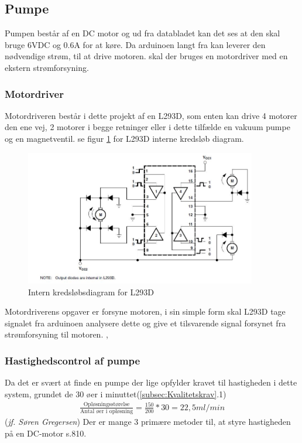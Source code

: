  \subsection{Pumpe}
 Pumpen består af en DC motor og ud fra databladet kan det ses at den skal bruge 6VDC og 0.6A for at køre. Da arduinoen langt fra kan leverer den nødvendige strøm, til at drive motoren. skal der bruges en motordriver med en ekstern strømforsyning.
 \subsubsection{Motordriver}
 Motordriveren består i dette projekt af en L293D, som enten kan drive 4 motorer den ene vej, 2 motorer i begge retninger eller i dette tilfælde en vakuum pumpe og en magnetventil. se figur \ref{fig:motordriverdiagram} for L293D interne kredsløb diagram. 
   \begin{figure}[H]
	\centering
	\includegraphics[width=0.9\textwidth]{billeder/Hardware/diagrammer/L293intern.JPG}
	\caption{Intern kredsløbsdiagram for L293D}
	\label{fig:motordriverdiagram}
\end{figure}
Motordriverens opgaver er forsyne motoren, i sin simple form skal L293D tage signalet fra arduinoen analysere dette og give et tilsvarende signal forsynet fra strømforsyning til motoren. ,
\subsubsection{Hastighedscontrol af pumpe}
Da det er svært at finde en pumpe der lige opfylder kravet til hastigheden i dette system, grundet de 30 øer i minuttet(\ref{subsec:Kvalitetskrav}.1)
\begin{align}
\frac{\text{Opløsningsstørelse}}{\text{Antal øer i opløsning}} = \frac{150}{200}*30 = 22,5ml/min
\end{align}(\textit{jf. Søren Gregersen})
Der er mange 3 primære metoder til, at styre hastigheden på en DC-motor \citep{ELengbog}s.810.

